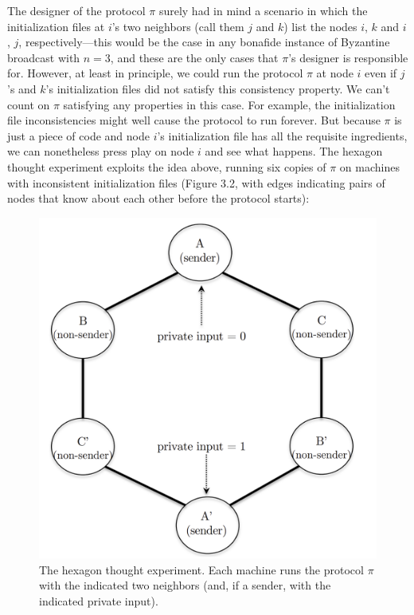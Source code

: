 The designer of the protocol $\pi$ surely had in mind a scenario in which the initialization
files at $i$’s two neighbors (call them $j$ and $k$) list the nodes $i$, $k$ and $i$, $j$, respectively—this
would be the case in any bonafide instance of Byzantine broadcast with $n = 3$, and these
are the only cases that $\pi$’s designer is responsible for. However, at least in principle, we
could run the protocol $\pi$ at node $i$ even if $j$’s and $k$’s initialization files did not satisfy
this consistency property. We can’t count on $\pi$ satisfying any properties in this case. For
example, the initialization file inconsistencies might well cause the protocol to run forever.
But because $\pi$ is just a piece of code and node $i$’s initialization file has all the requisite
ingredients, we can nonetheless press play on node $i$ and see what happens.
The hexagon thought experiment exploits the idea above, running six copies of $\pi$ on
machines with inconsistent initialization files (Figure 3.2, with edges indicating pairs of nodes
that know about each other before the protocol starts):
\begin{figure}[h]
    \centering
    \includegraphics[scale = 0.5]{figures/f4.png}
    \caption{The hexagon thought experiment. Each machine runs the protocol $\pi$ with the
indicated two neighbors (and, if a sender, with the indicated private input).}
    \label{fig:mesh1}
\end{figure}\\


